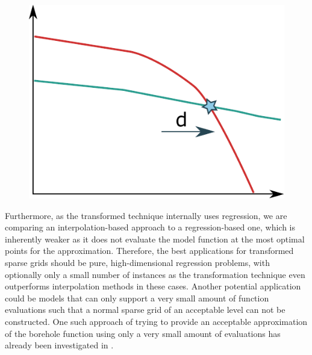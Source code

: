 \documentclass[
  a4paper,  %
  twoside,  %
  bibliography=totoc,
  headsepline,
  cleardoublepage=empty,
  parskip=half,
  draft=false
]{scrbook}
\begin{document}
\begin{mdframed}[style=style]
\begin{figure}[H]
        \centering
\begin{minipage}{0.49\textwidth}
        \centering
{}
\label{fig:trend}
    \end{minipage}%
    \begin{minipage}{0.49\textwidth}
        \centering
   \includegraphics[width=0.7\linewidth]{graphics/trend}
   \vspace{2mm}
    \end{minipage}
\end{figure}
\end{mdframed}
%
Furthermore, as the transformed technique internally uses regression, we are comparing an interpolation-based approach to a regression-based one, which is inherently weaker as it does not evaluate the model function at the most optimal points for the approximation.
Therefore, the best applications for transformed sparse grids should be pure, high-dimensional regression problems, with optionally only a small number of instances as the transformation technique even outperforms interpolation methods in these cases.
Another potential application could be models that can only support a very small amount of function evaluations such that a normal sparse grid of an acceptable level can not be constructed.
One such approach of trying to provide an acceptable approximation of the borehole function using only a very small amount of evaluations has already been investigated in \cite{Dette2010}.
\end{document}
